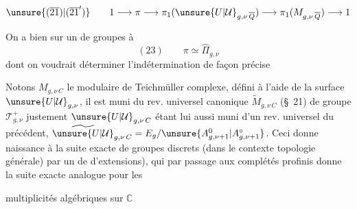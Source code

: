 
\[
\unsure{(\overline{21})|(\overline{21}')}\qquad
1\longrightarrow\pi\longrightarrow\pi_1(\unsure{U|\mathcal{U}}_{g,\nu\,\overline{Q}})
\longrightarrow\pi_1(M_{g,\nu\,\overline{Q}})\longrightarrow1
\]

On a bien sur un  de groupes à 
\[
(23)\qquad \pi\simeq\widehat{\Pi}_{g,\nu}
\]
dont on voudrait déterminer l'indétermination de façon précise

Notons $M_{g,\nu\,C}$ le  modulaire de Teichmüller complexe, défini à l'aide de la surface  $\unsure{U|\mathcal{U}}_{g,\nu}$, il est muni du rev. universel canonique $\widetilde{M}_{g,\nu\,C}$ (\S~21)
de groupe  $\mathcal{T}_{g,\nu}^{+}$ justement 
$\unsure{U|\mathcal{U}}_{g,\nu\,C}$ étant lui aussi muni d'un rev. universel  du précédent,
$\widetilde{\unsure{U|\mathcal{U}}}_{g,\nu\,C}=E_g/\unsure{A_{g,\nu+1}^{0}|A_{g,\nu+1}^{\circ}}$.
Ceci donne naissance à la suite exacte de groupes discrets (dans le contexte topologie générale)
par un  de  d'extensions), qui par passage aux complétés profinis donne la suite exacte analogue pour les


multiplicités algébriques sur $\mathbb C$

